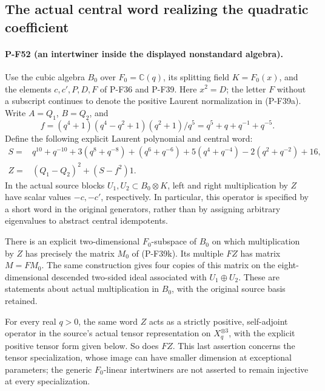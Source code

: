 \documentclass[11pt,a4paper]{article}
\begin{document}
\subsection{The actual central word realizing the quadratic coefficient}
\label{sec:nonstandard-central-word}

\paragraph{P-F52 (an intertwiner inside the displayed nonstandard algebra).}
Use the cubic algebra $B_0$ over $F_0=\mathbb C(q)$, its splitting
field $K=F_0(x)$, and the elements $c,c',P,D,F$ of P-F36 and P-F39.
Here $x^2=D$; the letter $F$ without a subscript continues to denote
the positive Laurent normalization in (P-F39a).
Write $A=Q_1$, $B=Q_2$, and
\[
 f=(q^4+1)(q^4-q^2+1)(q^2+1)/q^5
   =q^5+q+q^{-1}+q^{-5}.
\]
Define the following explicit Laurent polynomial and central word:
\[
 \begin{split}
 S={}&q^{10}+q^{-10}+3(q^8+q^{-8})+(q^6+q^{-6})
       +5(q^4+q^{-4})-2(q^2+q^{-2})+16,\\
 Z={}&(Q_1-Q_2)^2+(S-f^2)1.
 \end{split}                                                    \tag{P-F52a}
\]
In the actual source blocks $U_1,U_2\subset B_0\otimes K$,
left and right multiplication by $Z$ have scalar values $-c,-c'$,
respectively. In particular, this operator is specified by a short
word in the original generators, rather than by assigning arbitrary
eigenvalues to abstract central idempotents.

There is an explicit two-dimensional $F_0$-subspace of $B_0$ on
which multiplication by $Z$ has precisely the matrix $M_0$ of
(P-F39k). Its multiple $FZ$ has matrix $M=FM_0$.
The same construction gives four copies of this matrix on the
eight-dimensional descended two-sided ideal associated with
$U_1\oplus U_2$. These are statements about actual multiplication
in $B_0$, with the original source basis retained.

For every real $q>0$, the same word $Z$ acts as a strictly positive,
self-adjoint operator in the source's actual tensor representation
on $X_q^{\otimes3}$, with the explicit positive tensor form given
below. So does $FZ$. This last assertion concerns the tensor
specialization, whose image can have smaller dimension at exceptional
parameters; the generic $F_0$-linear intertwiners are not asserted to
remain injective at every specialization.
\end{document}

